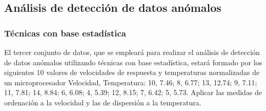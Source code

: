 \documentclass[a4paper, 12pt]{article}
\begin{document}
	\subsection{Análisis de detección de datos anómalos}
		
		\subsubsection{Técnicas con base estadística}
		El tercer conjunto de datos, que se empleará para realizar el análisis de detección de datos anómalos utilizando técnicas con base estadística, estará formado por los siguientes 10 valores de velocidades de respuesta y temperaturas normalizadas de un microprocesador {Velocidad, Temperatura}: {10, 7.46; 8, 6.77; 13, 12.74; 9, 7.11; 11, 7.81; 14, 8.84; 6, 6.08; 4, 5.39; 12, 8.15; 7, 6.42; 5, 5.73}. Aplicar las medidas de ordenación a la velocidad y las de dispersión a la temperatura.
		
\end{document}
